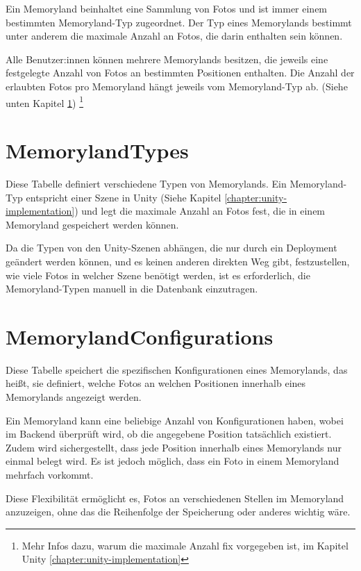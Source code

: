 Ein Memoryland beinhaltet eine Sammlung von Fotos und ist immer einem bestimmten 
Memoryland-Typ zugeordnet. Der Typ eines Memorylands bestimmt unter anderem die maximale 
Anzahl an Fotos, die darin enthalten sein können.

Alle Benutzer:innen können mehrere Memorylands besitzen, die jeweils eine festgelegte Anzahl 
von Fotos an bestimmten Positionen enthalten. Die Anzahl der erlaubten Fotos pro Memoryland
hängt jeweils vom Memoryland-Typ ab. (Siehe unten Kapitel \ref{sec:memoryland-types})
\footnote{Mehr Infos dazu, warum die maximale Anzahl fix vorgegeben ist, im Kapitel Unity \ref{chapter:unity-implementation}}

\section{MemorylandTypes}
\label{sec:memoryland-types}

Diese Tabelle definiert verschiedene Typen von Memorylands. Ein Memoryland-Typ 
entspricht einer Szene in Unity (Siehe Kapitel \ref{chapter:unity-implementation}) und legt die maximale Anzahl an Fotos fest, die in 
einem Memoryland gespeichert werden können.

Da die Typen von den Unity-Szenen abhängen, die nur durch ein Deployment geändert werden 
können, und es keinen anderen direkten Weg gibt, festzustellen, wie viele Fotos in welcher 
Szene benötigt werden, ist es erforderlich, die Memoryland-Typen manuell in die Datenbank 
einzutragen.

\section{MemorylandConfigurations}
\label{sec:memoryland-config}

Diese Tabelle speichert die spezifischen Konfigurationen eines Memorylands, das heißt, 
sie definiert, welche Fotos an welchen Positionen innerhalb eines Memorylands angezeigt werden. 

Ein Memoryland kann eine beliebige Anzahl von Konfigurationen haben, wobei im Backend überprüft 
wird, ob die angegebene Position tatsächlich existiert. Zudem wird sichergestellt, dass jede 
Position innerhalb eines Memorylands nur einmal belegt wird. Es ist jedoch möglich, dass ein 
Foto in einem Memoryland mehrfach vorkommt. 

Diese Flexibilität ermöglicht es, Fotos an verschiedenen Stellen im Memoryland anzuzeigen,
ohne das die Reihenfolge der Speicherung oder anderes wichtig wäre.


